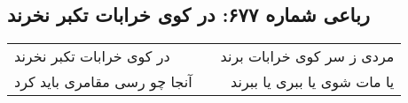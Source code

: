 \begin{center}
\section*{رباعی شماره ۶۷۷: در کوی خرابات تکبر نخرند}
\label{sec:0677}
\begin{longtable}{l p{0.5cm} r}
در کوی خرابات تکبر نخرند
&&
مردی ز سر کوی خرابات برند
\\
آنجا چو رسی مقامری باید کرد
&&
یا مات شوی یا ببری یا ببرند
\\
\end{longtable}
\end{center}
